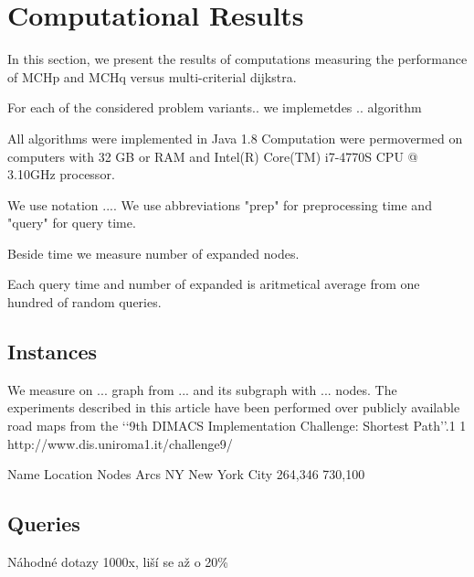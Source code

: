 
\section{Computational Results}
In this section, we present the results of computations measuring the performance
of MCHp and MCHq versus multi-criterial dijkstra.

For each of the considered problem variants..
we implemetdes .. algorithm


All algorithms were implemented in Java 1.8 
Computation were permovermed on computers with 32 GB or RAM
and  Intel(R) Core(TM) i7-4770S CPU @ 3.10GHz processor.

We use notation .... We use abbreviations "prep" for preprocessing time
and "query" for query time.

Beside time we measure number of expanded nodes.

Each query time and number of expanded is aritmetical average
from one hundred of random queries.
\subsection{Instances}

We measure on ... graph from ... and its subgraph with ... nodes.
The experiments described in this article have been performed
over publicly available road maps from the ‘‘9th DIMACS Implementation
Challenge: Shortest Path’’.1
1 http://www.dis.uniroma1.it/challenge9/

Name	Location	Nodes	Arcs
NY	New York City	264,346	730,100

\subsection{Queries}

Náhodné dotazy 1000x, liší se až o 20\%


